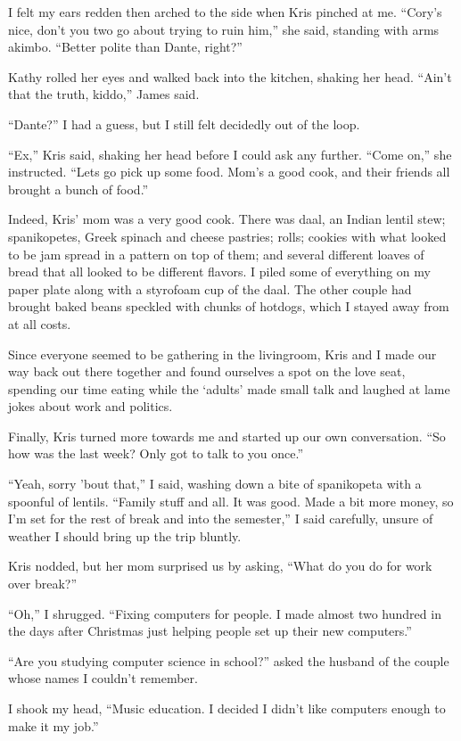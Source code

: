 I felt my ears redden then arched to the side when Kris pinched at me.  ``Cory's nice, don't you two go about trying to ruin him,'' she said, standing with arms akimbo.  ``Better polite than Dante, right?''

Kathy rolled her eyes and walked back into the kitchen, shaking her head.  ``Ain't that the truth, kiddo,'' James said.

``Dante?''  I had a guess, but I still felt decidedly out of the loop.

``Ex,'' Kris said, shaking her head before I could ask any further.  ``Come on,'' she instructed.  ``Lets go pick up some food.  Mom's a good cook, and their friends all brought a bunch of food.''

Indeed, Kris' mom was a very good cook.  There was daal, an Indian lentil stew; spanikopetes, Greek spinach and cheese pastries; rolls; cookies with what looked to be jam spread in a pattern on top of them; and several different loaves of bread that all looked to be different flavors.  I piled some of everything on my paper plate along with a styrofoam cup of the daal.  The other couple had brought baked beans speckled with chunks of hotdogs, which I stayed away from at all costs.

Since everyone seemed to be gathering in the livingroom, Kris and I made our way back out there together and found ourselves a spot on the love seat, spending our time eating while the `adults' made small talk and laughed at lame jokes about work and politics.

Finally, Kris turned more towards me and started up our own conversation.  ``So how was the last week?  Only got to talk to you once.''

``Yeah, sorry 'bout that,'' I said, washing down a bite of spanikopeta with a spoonful of lentils.  ``Family stuff and all.  It was good.  Made a bit more money, so I'm set for the rest of break and into the semester,'' I said carefully, unsure of weather I should bring up the trip bluntly.

Kris nodded, but her mom surprised us by asking, ``What do you do for work over break?''

``Oh,'' I shrugged.  ``Fixing computers for people.  I made almost two hundred in the days after Christmas just helping people set up their new computers.''

``Are you studying computer science in school?'' asked the husband of the couple whose names I couldn't remember.

I shook my head, ``Music education.  I decided I didn't like computers enough to make it my job.''

